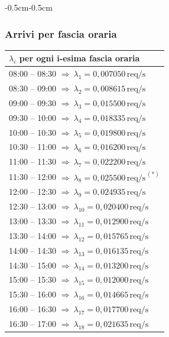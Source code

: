 \documentclass{article}
\begin{document}
\begin{adjustwidth}{-0.5cm}{-0.5cm}
\begin{minipage}[t]{0.48\textwidth}
\subsubsection{Arrivi per fascia oraria}
\begin{center}
\renewcommand{\arraystretch}{1.12}
\setlength{\tabcolsep}{6pt}
\begin{tabular}{|l|}
\hline
\textbf{$\lambda_i$ per ogni i-esima fascia oraria} \\ \hline
08:00 -- 08:30 $\Rightarrow\ \lambda_{1}=0{,}007050\,\text{req/s}$ \\ \hline
08:30 -- 09:00 $\Rightarrow\ \lambda_{2}=0{,}008615\,\text{req/s}$ \\ \hline
09:00 -- 09:30 $\Rightarrow\ \lambda_{3}=0{,}015500\,\text{req/s}$ \\ \hline
09:30 -- 10:00 $\Rightarrow\ \lambda_{4}=0{,}018335\,\text{req/s}$ \\ \hline
10:00 -- 10:30 $\Rightarrow\ \lambda_{5}=0{,}019800\,\text{req/s}$ \\ \hline
10:30 -- 11:00 $\Rightarrow\ \lambda_{6}=0{,}016200\,\text{req/s}$ \\ \hline
11:00 -- 11:30 $\Rightarrow\ \lambda_{7}=0{,}022200\,\text{req/s}$ \\ \hline
11:30 -- 12:00 $\Rightarrow\ \lambda_{8}=0{,}025500\,\text{req/s}^{\,(\ast)}$ \\ \hline
12:00 -- 12:30 $\Rightarrow\ \lambda_{9}=0{,}024935\,\text{req/s}$ \\ \hline
12:30 -- 13:00 $\Rightarrow\ \lambda_{10}=0{,}020400\,\text{req/s}$ \\ \hline
13:00 -- 13:30 $\Rightarrow\ \lambda_{11}=0{,}012900\,\text{req/s}$ \\ \hline
13:30 -- 14:00 $\Rightarrow\ \lambda_{12}=0{,}015765\,\text{req/s}$ \\ \hline
14:00 -- 14:30 $\Rightarrow\ \lambda_{13}=0{,}016135\,\text{req/s}$ \\ \hline
14:30 -- 15:00 $\Rightarrow\ \lambda_{14}=0{,}013200\,\text{req/s}$ \\ \hline
15:00 -- 15:30 $\Rightarrow\ \lambda_{15}=0{,}012000\,\text{req/s}$ \\ \hline
15:30 -- 16:00 $\Rightarrow\ \lambda_{16}=0{,}014665\,\text{req/s}$ \\ \hline
16:00 -- 16:30 $\Rightarrow\ \lambda_{17}=0{,}017700\,\text{req/s}$ \\ \hline
16:30 -- 17:00 $\Rightarrow\ \lambda_{18}=0{,}021635\,\text{req/s}$ \\ \hline

\end{tabular}
\end{center}
\end{minipage}
\end{adjustwidth}
\end{document}
